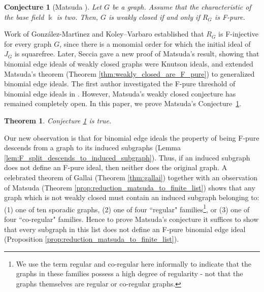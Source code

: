 \documentclass[12pt,a4paper]{amsart}
\theoremstyle{plain}
\newtheorem{theoremx}{Theorem}
\newtheorem{conjx}{Conjecture}
\theoremstyle{definition}
\theoremstyle{remark}
\def\k{\Bbbk}
\begin{document}
\begin{conjx}[Matsuda {\cite[Conjecture 2.8]{matsuda2018weakly}}]
\label{conj:weakly_closed_equiv_F_pure_in_char_2}
Let $G$ be a graph. Assume that the characteristic of the base field $\k$ is two. Then, $G$ is weakly closed if and only if $R_{G}$ is F-pure.
\end{conjx}

\noindent Work of Gonz{\'a}lez-Mart{\'\i}nez \cite[Theorem 4.3]{gonzalez2021gorenstein} and Koley--Varbaro \cite[Corollary 4.11]{koley2023grobner} established that $R_{G}$ is F-injective for every graph $G$, since there is a monomial order for which the initial ideal of $J_{G}$ is squarefree. Later, Seccia \cite{seccia2023binomial} gave a new proof of Matsuda's result, showing that binomial edge ideals of weakly closed graphs were Knutson ideals, and extended Matsuda's theorem (Theorem \ref{thm:weakly_closed_are_F_pure}) to generalized binomial edge ideals.  The first author investigated the F-pure threshold of binomial edge ideals in \cite{laclair2023invariants}. However, Matsuda's weakly closed conjecture has remained completely open. In this paper, we prove Matsuda's Conjecture~\ref{conj:weakly_closed_equiv_F_pure_in_char_2}.

\begin{theoremx}%
\label{thm:matsudas_conjecture_is_true}
Conjecture \ref{conj:weakly_closed_equiv_F_pure_in_char_2} is true.
\end{theoremx}

Our new observation is that for binomial edge ideals the property of being F-pure descends from a graph to its induced subgraphs (Lemma \ref{lem:F_split_descends_to_induced_subgraph}). Thus, if an induced subgraph does not define an F-pure ideal, then neither does the original graph. A celebrated theorem of Gallai (Theorem \ref{thm:gallai}) together with an observation of Matsuda (Theorem \ref{prop:reduction_matsuda_to_finite_list}) shows that any graph which is not weakly closed must contain an induced subgraph belonging to: (1) one of ten sporadic graphs, (2) one of four ``regular" families\footnote{We use the term regular and co-regular here informally to indicate that the graphs in these families possess a high degree of regularity - not that the graphs themselves are regular or co-regular graphs.}, or (3) one of four ``co-regular" families. Hence to prove Matsuda's conjecture it suffices to show that every subgraph in this list does not define an F-pure binomial edge ideal (Proposition \ref{prop:reduction_matsuda_to_finite_list}). 
\end{document}
